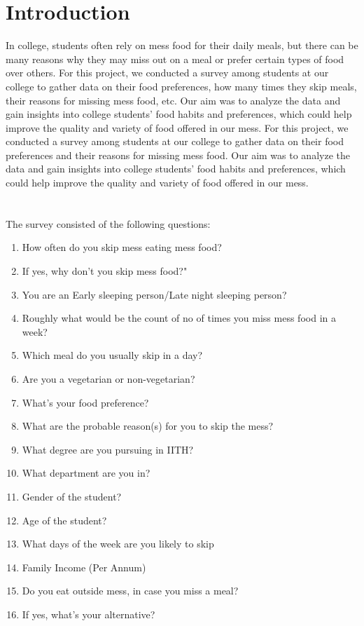 \documentclass{article}
\begin{document}
\section{Introduction}
 In college, students often rely on mess food for their daily meals, but there can be many reasons why they may miss out on a meal or prefer certain types of food over others. For this project, we conducted a survey among students at our college to gather data on their food preferences, how many times they skip meals, their reasons for missing mess food, etc. Our aim was to analyze the data and gain insights into college students' food habits and preferences, which could help improve the quality and variety of food offered in our mess.
 For this project, we conducted a survey among students at our college to gather data on their food preferences and their reasons for missing mess food. Our aim was to analyze the data and gain insights into college students' food habits and preferences, which could help improve the quality and variety of food offered in our mess.\\\\\\
 The survey consisted of the following questions:
\begin{enumerate}
\item How often do you skip mess eating mess food?
\item If yes, why don't you skip mess food?"
\item You are an Early sleeping person/Late night sleeping person?
\item Roughly what would be the count of no of times you miss mess food in a week?
\item Which meal do you usually skip in a day?
\item Are you a vegetarian or non-vegetarian?
\item What's your food preference?
\item What are the probable reason(s) for you to skip the mess?
\item What degree are you pursuing in IITH?
\item What department are you in?
\item Gender of the student?
\item Age of the student?
\item What days of the week are you likely to skip
\item Family Income (Per Annum)
\item Do you eat outside mess, in case you miss a meal?
\item If yes, what's your alternative? 
\end{enumerate}
\end{document}
